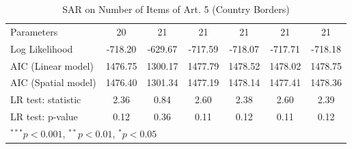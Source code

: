 \begin{table}[!h]
\begin{center}
\begin{tabular}{l c c c c c c }
Parameters              & 20           & 21           & 21           & 21           & 21           & 21           \\
Log Likelihood          & -718.20      & -629.67      & -717.59      & -718.07      & -717.71      & -718.18      \\
AIC (Linear model)      & 1476.75      & 1300.17      & 1477.79      & 1478.52      & 1478.02      & 1478.75      \\
AIC (Spatial model)     & 1476.40      & 1301.34      & 1477.19      & 1478.14      & 1477.41      & 1478.36      \\
LR test: statistic      & 2.36         & 0.84         & 2.60         & 2.38         & 2.60         & 2.39         \\
LR test: p-value        & 0.12         & 0.36         & 0.11         & 0.12         & 0.11         & 0.12         \\
\bottomrule
\multicolumn{7}{l}{\scriptsize{$^{***}p<0.001$, $^{**}p<0.01$, $^*p<0.05$}}
\end{tabular}
\caption{SAR on Number of Items of Art. 5 (Country Borders)}
\label{table:coefficients}
\end{center}
\end{table}

